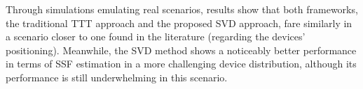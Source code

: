 Through simulations emulating real scenarios, results show that both frameworks, the traditional TTT approach and the proposed SVD approach, fare similarly in a scenario closer to one found in the literature (regarding the devices' positioning). Meanwhile, the SVD method shows a noticeably better performance in terms of SSF estimation in a more challenging device distribution, although its performance is still underwhelming in this scenario.


